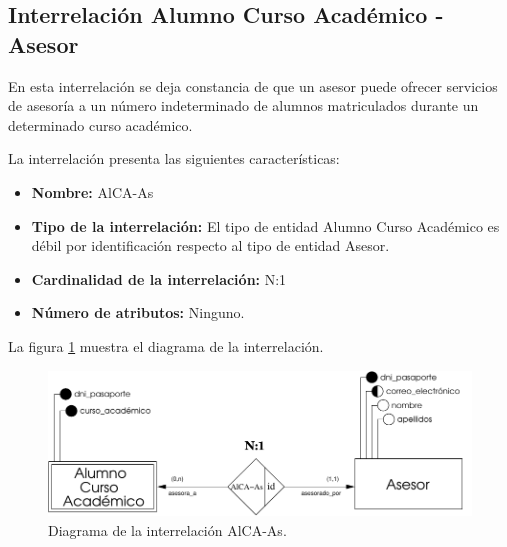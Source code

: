 \subsection{Interrelación Alumno Curso Académico - Asesor}

   \begin{description}
      \item[Definición] En esta interrelación se deja constancia de que un
      asesor puede ofrecer servicios de asesoría a un número indeterminado
      de alumnos matriculados durante un determinado curso académico.

      \item[Características] La interrelación presenta las siguientes
                             características:

         \begin{itemize}
            \item \textbf{Nombre:} AlCA-As
            \item \textbf{Tipo de la interrelación:} El tipo de entidad
                  Alumno Curso Académico es débil por identificación respecto al
                  tipo de entidad Asesor.
            \item \textbf{Cardinalidad de la interrelación:} N:1
            \item \textbf{Número de atributos:} Ninguno.
         \end{itemize}

      \item[Diagrama] La figura \ref{diagramaAlCA-As} muestra el diagrama de la
                      interrelación.

      \item \begin{figure}[!ht]
            \begin{center}
            \includegraphics[]{07.Modelo_Entidad-Interrelacion/7.3.Analisis_Interrelaciones/diagramas/AlCA-As.pdf}
            \caption{Diagrama de la interrelación AlCA-As.}
            \label{diagramaAlCA-As}
            \end{center}
         \end{figure}


\end{description}
